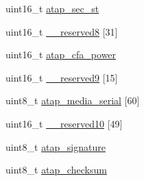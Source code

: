 \begin{DoxyCompactItemize}
\item 
uint16\_\-t \hyperlink{structataparams_ae9b71956ed8e0d729b045daad31595e3}{atap\_\-sec\_\-st}
\item 
uint16\_\-t \hyperlink{structataparams_a03dedd3b1349555b37033ff082885e53}{\_\-\_\-reserved8} \mbox{[}31\mbox{]}
\item 
uint16\_\-t \hyperlink{structataparams_aac87e4551b768f795cf1214ce34c66b6}{atap\_\-cfa\_\-power}
\item 
uint16\_\-t \hyperlink{structataparams_a733f737022c08321c9d6e063cf47b66b}{\_\-\_\-reserved9} \mbox{[}15\mbox{]}
\item 
uint8\_\-t \hyperlink{structataparams_a01051e9e39485c8a979cddd2628e58d3}{atap\_\-media\_\-serial} \mbox{[}60\mbox{]}
\item 
uint16\_\-t \hyperlink{structataparams_aac77efaabc8abdcd6d8407f65d174c2e}{\_\-\_\-reserved10} \mbox{[}49\mbox{]}
\item 
uint8\_\-t \hyperlink{structataparams_ac23d146c48d943a085e1952a951bd7ee}{atap\_\-signature}
\item 
uint8\_\-t \hyperlink{structataparams_a94f586b0b58e65280ec19f1500f57579}{atap\_\-checksum}
\end{DoxyCompactItemize}


